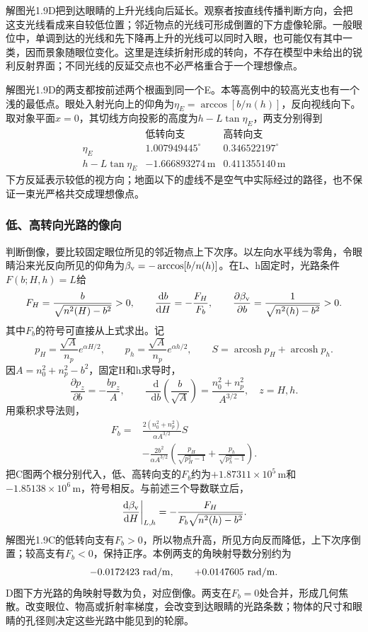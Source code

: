 \documentclass[UTF8,fontset=fandol,a4paper,11pt]{ctexart}
\newcommand{\dd}{\mathop{}\!\mathrm{d}}
\begin{document}
解图光1.9D把到达眼睛的上升光线向后延长。观察者按直线传播判断方向，会把这支光线看成来自较低位置；邻近物点的光线可形成倒置的下方虚像轮廓。一般眼位中，单调到达的光线和先下降再上升的光线可以同时入眼，也可能仅有其中一类，因而景象随眼位变化。这里是连续折射形成的转向，不存在模型中未给出的锐利反射界面；不同光线的反延交点也不必严格重合于一个理想像点。

解图光1.9D的两支都按前述两个根画到同一个E。本等高例中的较高光支也有一个浅的最低点。眼处入射光向上的仰角为$\eta_E=\arccos[b/n(h)]$，反向视线向下。取对象平面$x=0$，其切线方向投影的高度为$h-L\tan\eta_E$，两支分别得到
\[
\begin{array}{c|cc}
 &\text{低转向支}&\text{高转向支}\\ \hline
\eta_E&1.007949445^\circ&0.346522197^\circ\\
h-L\tan\eta_E&-1.666893274\,\mathrm m&0.411355140\,\mathrm m
\end{array}
\]
下方反延表示较低的视方向；地面以下的虚线不是空气中实际经过的路径，也不保证一束光严格共交成理想像点。

\subsubsection*{低、高转向光路的像向}
判断倒像，要比较固定眼位所见的邻近物点上下次序。以左向水平线为零角，令眼睛沿来光反向所见的仰角为$\beta_{\rm v}=-\arccos[b/n(h)]$。在L、h固定时，光路条件$F(b;H,h)=L$给
\[
F_H=\frac{b}{\sqrt{n^2(H)-b^2}}>0,\qquad
\frac{\dd b}{\dd H}=-\frac{F_H}{F_b},
\qquad
\frac{\partial\beta_{\rm v}}{\partial b}
=\frac1{\sqrt{n^2(h)-b^2}}>0.
\]
其中$F_b$的符号可直接从上式求出。记
\[
p_H=\frac{\sqrt A}{n_p}e^{\alpha H/2},\qquad
p_h=\frac{\sqrt A}{n_p}e^{\alpha h/2},\qquad
S=\operatorname{arcosh}p_H+\operatorname{arcosh}p_h.
\]
因$A=n_0^2+n_p^2-b^2$，固定H和h求导时，
\[
\frac{\partial p_z}{\partial b}=-\frac{bp_z}{A},\qquad
\frac{\dd}{\dd b}\left(\frac{b}{\sqrt A}\right)
=\frac{n_0^2+n_p^2}{A^{3/2}},\quad z=H,h.
\]
用乘积求导法则，
\[
\begin{aligned}
F_b={}&\frac{2(n_0^2+n_p^2)}{\alpha A^{3/2}}S\\
&-\frac{2b^2}{\alpha A^{3/2}}
\left(\frac{p_H}{\sqrt{p_H^2-1}}
+\frac{p_h}{\sqrt{p_h^2-1}}\right).
\end{aligned}
\]
把C图两个根分别代入，低、高转向支的$F_b$约为$+1.87311\times10^5\,\mathrm m$和$-1.85138\times10^6\,\mathrm m$，符号相反。与前述三个导数联立后，
\[
\left.\frac{\dd\beta_{\rm v}}{\dd H}\right|_{L,h}
=-\frac{F_H}{F_b\sqrt{n^2(h)-b^2}}.
\]
解图光1.9C的低转向支有$F_b>0$，所以物点升高，所见方向反而降低，上下次序倒置；较高支有$F_b<0$，保持正序。本例两支的角映射导数分别约为
\[
-0.0172423\ {\rm rad/m},\qquad
+0.0147605\ {\rm rad/m}.
\]
D图下方光路的角映射导数为负，对应倒像。两支在$F_b=0$处合并，形成几何焦散。改变眼位、物高或折射率梯度，会改变到达眼睛的光路条数；物体的尺寸和眼睛的孔径则决定这些光路中能见到的轮廓。
\end{document}

